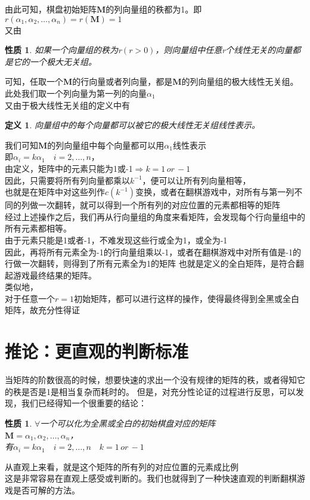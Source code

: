 \documentclass[UTF-8,a4paper]{ctexart}
\newtheorem{definition}[subsubsection]{定义}
\newtheorem{property}[subsubsection]{性质}
\begin{document}
由此可知，棋盘初始矩阵\(\mathbf{M}\)的列向量组的秩都为1。即\(r(\alpha_1,\alpha_2,\dots,\alpha_n)=r(\mathbf{M})=1\)
\\又由
\begin{property}
    如果一个向量组的秩为r\((r > 0)\)，则向量组中任意r个线性无关的向量都是它的一个极大无关组。
\end{property}
可知，任取一个\(\mathbf{M}\)的行向量或者列向量，都是\(\mathbf{M}\)的列向量组的极大线性无关组。
\\此处我们取一个列向量为第一列的向量\(\alpha_1\)
\\又由于极大线性无关组的定义中有
\begin{definition}
    向量组中的每个向量都可以被它的极大线性无关组线性表示。
\end{definition}
我们可知\(\mathbf{M}\)的列向量组中每个向量都可以用\(\alpha_1\)线性表示
\\即\(\alpha_i = k \alpha_1 \quad i=2,\dots,n\)，
\\由定义，矩阵中的元素只能为1或-1\(\Rightarrow k = 1\, or\, -1\)
\\因此，只需要将所有列向量都乘以\(k^{-1}\)，便可以让所有列向量相等，
\\也就是在矩阵中对这些列作\(c(k^{-1})\)变换，或者在翻棋游戏中，对所有与第一列不同的列做一次翻转，就可以得到一个所有列的对应位置的元素都相等的矩阵
\\经过上述操作之后，我们再从行向量组的角度来看矩阵，会发现每个行向量组中的所有元素都相等。
\\由于元素只能是1或者-1，不难发现这些行或全为1，或全为-1
\\因此，再将所有元素全为-1的行向量组乘以-1，或者在翻棋游戏中对所有值是-1的行做一次翻转，则得到了所有元素全为1的矩阵
也就是定义的全白矩阵，是符合翻起游戏最终结果的矩阵。
\\类似地，
\\对于任意一个\(r=1\)初始矩阵，都可以进行这样的操作，使得最终得到全黑或全白矩阵，故充分性得证


\section{推论：更直观的判断标准}
\songti
当矩阵的阶数很高的时候，想要快速的求出一个没有规律的矩阵的秩，或者得知它的秩是否是1是相当复杂而耗时的。
但是，对充分性论证的过程进行反思，可以发现，我们已经得知一个很重要的结论：
\kaishu
\begin{property}
    \(\forall\)一个可以化为全黑或全白的初始棋盘对应的矩阵
    \\\(\mathbf{M}=\alpha_1,\alpha_2,\dots,\alpha_n\)，
    \\有\(\alpha_i = k \alpha_1 \quad i=2,\dots,n \quad k = 1\, or\, -1\)
\end{property}
\songti
从直观上来看，就是这个矩阵的所有列的对应位置的元素成比例
\\这是非常容易在直观上感受或判断的。我们也就得到了一种快速直观的判断翻棋游戏是否可解的方法。
\end{document}
